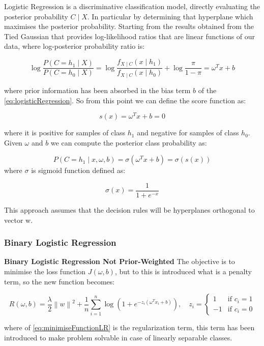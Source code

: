 
Logistic Regression is a discriminative classification model, directly evaluating the posterior probability \(C \mid X\).
In particular by determining that hyperplane which maximises the posterior probability.
Starting from the results obtained from the Tied Gaussian that provides log-likelihood ratios that are linear functions
of our data, where log-posterior probability ratio is:

\begin{equation}
    \log \frac{P(C=h_1 \mid X)}{P(C=h_0 \mid X)} = \log \frac{f_{X \mid C}(x \mid h_1)}{f_{X \mid C}(x \mid h_0)} + \log \frac{\pi}{1-\pi} = \omega^T x + b
    \label{eq:logisticRegression}
\end{equation}

where prior information has been absorbed in the bias term \(b\) of the \autoref{eq:logisticRegression}.
So from this point we can define the score function as:

\begin{equation}
    s(x) = \omega^T x + b = 0
    \label{eq:scoreFunctionLR}
\end{equation}

where it is positive for samples of class \(h_1\) and negative for samples of class \(h_0\).
Given \(\omega\) and \(b\) we can compute the posterior class probability as:

\begin{equation}
    P(C=h_1 \mid x, \omega, b) = \sigma(\omega^T x + b) = \sigma(s(x))
    \label{eq:posteriorClassProbabilityLR}
\end{equation}
where \(\sigma\) is sigmoid function defined as:

\begin{equation}
    \sigma(x) = \frac{1}{1 + e^{-x}}
\end{equation}

This approach assumes that the decision rules will be hyperplanes orthogonal to vector w.

\subsubsection{Binary Logistic Regression}
\textbf{Binary Logistic Regression Not Prior-Weighted}\n
The objective is to minimise the loss function \(J(\omega,b)\), but to this is introduced what is a penalty term,
so the new function becomes:

\begin{equation}
    R(\omega,b) = \frac{\lambda}{2}\left\|w \right\|^2 + \frac{1}{n} \sum_{i=1}^{n} \log (1+e^{-z_i(\omega^T x_i + b)}), \quad
    z_i = \begin{cases}
              1 & \text{if } c_i = 1 \\
              -1 & \text{if } c_i = 0
    \end{cases}
    \label{eq:minimiseFunctionLR}
\end{equation}

where \lampda of \autoref{eq:minimiseFunctionLR} is the regularization term, this term has been introduced to make problem
solvable in case of linearly separable classes.
